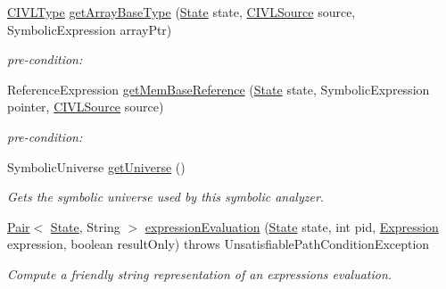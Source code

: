 \begin{DoxyCompactItemize}
\item 
\hyperlink{interfaceedu_1_1udel_1_1cis_1_1vsl_1_1civl_1_1model_1_1IF_1_1type_1_1CIVLType}{C\+I\+V\+L\+Type} \hyperlink{interfaceedu_1_1udel_1_1cis_1_1vsl_1_1civl_1_1semantics_1_1IF_1_1SymbolicAnalyzer_a0c9564662a701144510741b1c81c00d2}{get\+Array\+Base\+Type} (\hyperlink{interfaceedu_1_1udel_1_1cis_1_1vsl_1_1civl_1_1state_1_1IF_1_1State}{State} state, \hyperlink{interfaceedu_1_1udel_1_1cis_1_1vsl_1_1civl_1_1model_1_1IF_1_1CIVLSource}{C\+I\+V\+L\+Source} source, Symbolic\+Expression array\+Ptr)
\begin{DoxyCompactList}\small\item\em pre-\/condition\+: \end{DoxyCompactList}\item 
Reference\+Expression \hyperlink{interfaceedu_1_1udel_1_1cis_1_1vsl_1_1civl_1_1semantics_1_1IF_1_1SymbolicAnalyzer_a1c40f36a127ec7e4469a435ef395ddcc}{get\+Mem\+Base\+Reference} (\hyperlink{interfaceedu_1_1udel_1_1cis_1_1vsl_1_1civl_1_1state_1_1IF_1_1State}{State} state, Symbolic\+Expression pointer, \hyperlink{interfaceedu_1_1udel_1_1cis_1_1vsl_1_1civl_1_1model_1_1IF_1_1CIVLSource}{C\+I\+V\+L\+Source} source)
\begin{DoxyCompactList}\small\item\em pre-\/condition\+: \end{DoxyCompactList}\item 
Symbolic\+Universe \hyperlink{interfaceedu_1_1udel_1_1cis_1_1vsl_1_1civl_1_1semantics_1_1IF_1_1SymbolicAnalyzer_aee638149710a496ce3ad6f3487b650cc}{get\+Universe} ()
\begin{DoxyCompactList}\small\item\em Gets the symbolic universe used by this symbolic analyzer. \end{DoxyCompactList}\item 
\hyperlink{classedu_1_1udel_1_1cis_1_1vsl_1_1civl_1_1util_1_1IF_1_1Pair}{Pair}$<$ \hyperlink{interfaceedu_1_1udel_1_1cis_1_1vsl_1_1civl_1_1state_1_1IF_1_1State}{State}, String $>$ \hyperlink{interfaceedu_1_1udel_1_1cis_1_1vsl_1_1civl_1_1semantics_1_1IF_1_1SymbolicAnalyzer_a45ba9f855e00d09161471b437e13ad15}{expression\+Evaluation} (\hyperlink{interfaceedu_1_1udel_1_1cis_1_1vsl_1_1civl_1_1state_1_1IF_1_1State}{State} state, int pid, \hyperlink{interfaceedu_1_1udel_1_1cis_1_1vsl_1_1civl_1_1model_1_1IF_1_1expression_1_1Expression}{Expression} expression, boolean result\+Only)  throws Unsatisfiable\+Path\+Condition\+Exception
\begin{DoxyCompactList}\small\item\em Compute a friendly string representation of an expression\textquotesingle{}s evaluation. \end{DoxyCompactList}\item 

\end{DoxyCompactItemize}
